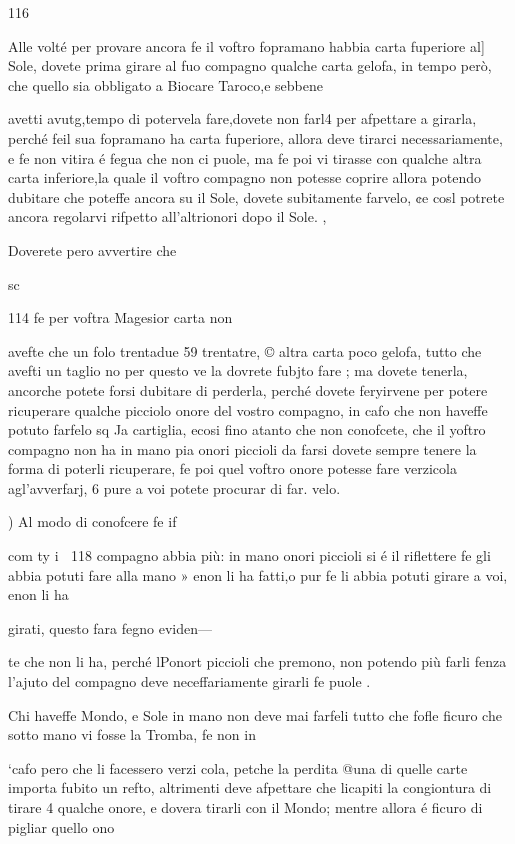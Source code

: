 \documentclass[12pt,a6paper]{article}
\begin{document}
116

Alle volté per provare ancora fe il voftro fopramano
habbia carta fuperiore al] Sole,
dovete prima girare al fuo compagno qualche carta gelofa, in
tempo però, che quello sia obbligato
a Biocare Taroco,e sebbene

avetti avutg,tempo di potervela
fare,dovete non farl4 per afpettare a girarla, perché feil sua
fopramano ha carta fuperiore,
allora deve tirarci necessariamente, e fe non vitira é fegua
che non ci puole, ma fe poi vi
tirasse con qualche altra carta
inferiore,la quale il voftro compagno non potesse coprire allora potendo dubitare che poteffe
ancora su il Sole, dovete subitamente farvelo, ¢e cosl potrete
ancora regolarvi rifpetto all’altrionori dopo il Sole. ,

Doverete pero avvertire che

sc
 

114
fe per voftra Magesior carta non

avefte che un folo trentadue 59
trentatre, © altra carta poco
gelofa, tutto che avefti un taglio
no per questo ve la dovrete fubjto fare ; ma dovete tenerla, ancorche potete forsi dubitare di
perderla, perché dovete feryirvene per potere ricuperare
qualche picciolo onore del vostro compagno, in cafo che non
haveffe potuto farfelo sq Ja cartiglia, ecosi fino atanto che
non conofcete, che il yoftro
compagno non ha in mano pia
onori piccioli da farsi dovete
sempre tenere la forma di poterli ricuperare, fe poi quel
voftro onore potesse fare verzicola agl’avverfarj, 6 pure
a voi potete procurar di far.
velo.

) Al modo di conofcere fe if

com
ty i
118
compagno abbia più: in mano
onori piccioli si é il riflettere fe
gli abbia potuti fare alla mano »
enon li ha fatti,o pur fe li abbia
potuti girare a voi, enon li ha

girati, questo fara fegno eviden—

te che non li ha, perché lPonort
piccioli che premono, non potendo più farli fenza l’ajuto del
compagno deve neceffariamente girarli fe puole .

Chi haveffe Mondo, e Sole in
mano non deve mai farfeli tutto
che fofle ficuro che sotto mano
vi fosse la Tromba, fe non in

‘cafo pero che li facessero verzi
cola, petche la perdita @una di
quelle carte importa fubito un
refto, altrimenti deve afpettare
che licapiti la congiontura di
tirare 4 qualche onore, e dovera tirarli con il Mondo; mentre
allora é ficuro di pigliar quello
ono  
\end{document}
